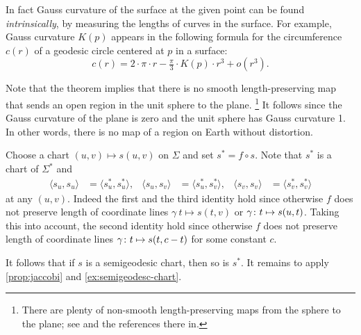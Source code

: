 In fact Gauss curvature of the surface at the given point can be found {}\emph{intrinsically},
by measuring the lengths of curves in the surface.
For example, Gauss curvature $K(p)$ appears in the following formula for the circumference $c(r)$ of a geodesic circle centered at $p$ in a surface: 
\[c(r)=2\cdot\pi\cdot r-\tfrac\pi3\cdot K(p)\cdot r^3+o(r^3).\]

Note that the theorem implies that there is no smooth length-preserving map that sends an open region in the unit sphere to the plane.%
\footnote{There are plenty of non-smooth length-preserving maps from the sphere to the plane; see \cite{petrunin-yashinski} and the references there in.}
It follows since the Gauss curvature of the plane is zero and the unit sphere has Gauss curvature 1. 
In other words, there is no map of a region on Earth without distortion.

 Choose a chart $(u,v)\mapsto s(u,v)$ on $\Sigma$ and set
$s^{*} =f\circ s$.
Note that $s^{*}$ is a chart of $\Sigma^{*}$ and 
\begin{align*}
\langle s_u,s_u\rangle
&=
\langle s_u^{*}, s_u^{*}\rangle,
&
\langle s_u, s_v\rangle
&=
\langle s_u^{*}, s_v^{*}\rangle,
&
\langle s_v, s_v\rangle
&=
\langle s_v^{*}, s_v^{*}\rangle
\end{align*}
at any $(u,v)$.
Indeed the first and the third identity hold since otherwise $f$ does not preserve length of coordinate lines $\gamma\:t\mapsto s(t,v)$ or  $\gamma\:t\z\mapsto s(u,t)$.
Taking this into account, the second identity hold since otherwise $f$ does not preserve length of coordinate lines $\gamma\:t\z\mapsto s(t,c-t)$ for some constant $c$.

It follows that if $s$ is a semigeodesic chart,
then so is $s^{*}$.
It remains to apply \ref{prop:jaccobi} and \ref{ex:semigeodesc-chart}.
\qeds
